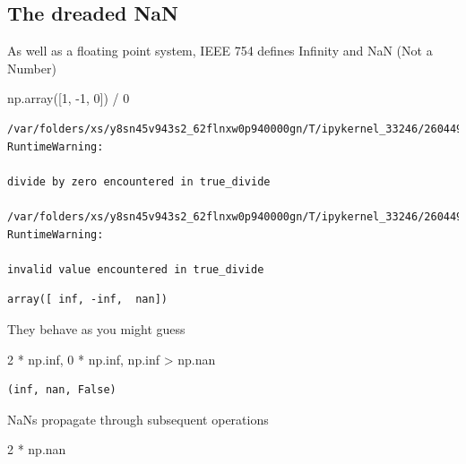 \documentclass[
  letterpaper,
  DIV=11,
  numbers=noendperiod]{scrreprt}
\newenvironment{Shaded}{\begin{snugshade}}{\end{snugshade}}
\newcommand{\DecValTok}[1]{\textcolor[rgb]{0.68,0.00,0.00}{#1}}
\newcommand{\NormalTok}[1]{\textcolor[rgb]{0.00,0.23,0.31}{#1}}
\newcommand{\OperatorTok}[1]{\textcolor[rgb]{0.37,0.37,0.37}{#1}}
\theoremstyle{definition}
\theoremstyle{remark}
\begin{document}
\hypertarget{the-dreaded-nan}{%
\subsection{The dreaded NaN}\label{the-dreaded-nan}}

As well as a floating point system, IEEE 754 defines Infinity and NaN
(Not a Number)

\begin{Shaded}
\begin{Highlighting}[]
\NormalTok{np.array([}\DecValTok{1}\NormalTok{, }\OperatorTok{{-}}\DecValTok{1}\NormalTok{, }\DecValTok{0}\NormalTok{]) }\OperatorTok{/} \DecValTok{0}
\end{Highlighting}
\end{Shaded}

\begin{verbatim}
/var/folders/xs/y8sn45v943s2_62flnxw0p940000gn/T/ipykernel_33246/2604490398.py:1: RuntimeWarning:

divide by zero encountered in true_divide

/var/folders/xs/y8sn45v943s2_62flnxw0p940000gn/T/ipykernel_33246/2604490398.py:1: RuntimeWarning:

invalid value encountered in true_divide
\end{verbatim}

\begin{verbatim}
array([ inf, -inf,  nan])
\end{verbatim}

They behave as you might guess

\begin{Shaded}
\begin{Highlighting}[]
\DecValTok{2} \OperatorTok{*}\NormalTok{ np.inf, }\DecValTok{0} \OperatorTok{*}\NormalTok{ np.inf, np.inf }\OperatorTok{\textgreater{}}\NormalTok{ np.nan}
\end{Highlighting}
\end{Shaded}

\begin{verbatim}
(inf, nan, False)
\end{verbatim}

NaNs propagate through subsequent operations

\begin{Shaded}
\begin{Highlighting}[]
\DecValTok{2} \OperatorTok{*}\NormalTok{ np.nan}
\end{Highlighting}
\end{Shaded}
\end{document}
